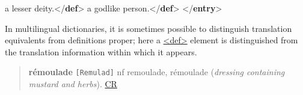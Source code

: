 \begin{shaded}
\hspace*{1em}\mbox{}\newline 
\hspace*{1em}\mbox{}\newline 
\hspace*{1em}\hspace*{1em}a lesser deity.{</\textbf{def}>}\mbox{}\newline 
\hspace*{1em}\mbox{}\newline 
{}\mbox{}\newline 
{}\mbox{}\newline 
\hspace*{1em}a godlike person.{</\textbf{def}>}\mbox{}\newline 
{}\mbox{}\newline 
{</\textbf{entry}>}\end{shaded}\egroup\par \par
In multilingual dictionaries, it is sometimes possible to distinguish translation equivalents from definitions proper; here a \hyperref[TEI.def]{<def>} element is distinguished from the translation information within which it appears.
\begin{quote}{\bfseries rémoulade} \texttt{[Remulad]} nf remoulade, rémoulade ({\itshape dressing containing mustard and herbs}). \hyperref[DIC-CR]{CR}\end{quote}
